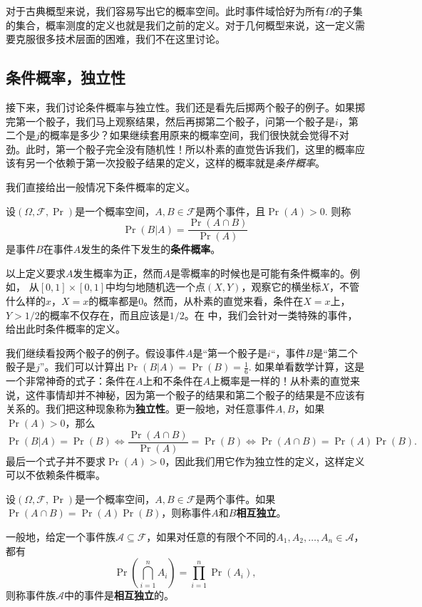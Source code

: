 对于古典概型来说，我们容易写出它的概率空间。此时事件域恰好为所有$\Omega$的子集的集合，概率测度的定义也就是我们之前的定义。对于几何概型来说，这一定义需要克服很多技术层面的困难，我们不在这里讨论。

\subsection{条件概率，独立性}
接下来，我们讨论条件概率与独立性。我们还是看先后掷两个骰子的例子。如果掷完第一个骰子，我们马上观察结果，然后再掷第二个骰子，问第一个骰子是$i$，第二个是$j$的概率是多少？如果继续套用原来的概率空间，我们很快就会觉得不对劲。此时，第一个骰子完全没有随机性！所以朴素的直觉告诉我们，这里的概率应该有另一个依赖于第一次投骰子结果的定义，这样的概率就是\emph{条件概率}。

我们直接给出一般情况下条件概率的定义。

\begin{definition}[条件概率]
设$(\Omega,\mathscr{F},\Pr)$是一个概率空间，$A,B\in\mathscr{F}$是两个事件，且$\Pr(A)>0$. 则称
\[
    \Pr(B|A) = \frac{\Pr(A\cap B)}{\Pr(A)}
\]
是事件$B$在事件$A$发生的条件下发生的\textbf{条件概率}。
\end{definition}

以上定义要求$A$发生概率为正，然而$A$是零概率的时候也是可能有条件概率的。例如，
从$[0,1]\times[0,1]$中均匀地随机选一个点$(X,Y)$，观察它的横坐标$X$，不管什么样的$x$，$X=x$的概率都是$0$。然而，从朴素的直觉来看，条件在$X=x$上，$Y>1/2$的概率不仅存在，而且应该是$1/2$。在 中，我们会针对一类特殊的事件，给出此时条件概率的定义。

我们继续看投两个骰子的例子。假设事件$A$是“第一个骰子是$i$“，事件$B$是“第二个骰子是$j$”。我们可以计算出$\Pr(B|A)=\Pr(B)=\frac{1}{6}$. 如果单看数学计算，这是一个非常神奇的式子：条件在$A$上和不条件在$A$上概率是一样的！从朴素的直觉来说，这件事情却并不神秘，因为第一个骰子的结果和第二个骰子的结果是不应该有关系的。我们把这种现象称为\textbf{独立性}。更一般地，对任意事件$A,B$，如果$\Pr(A)>0$，那么
\[\Pr(B|A)=\Pr(B)\iff \frac{\Pr(A\cap B)}{\Pr(A)}=\Pr(B)\iff \Pr(A\cap B)=\Pr(A)\Pr(B).\]
最后一个式子并不要求$\Pr(A)>0$，因此我们用它作为独立性的定义，这样定义可以不依赖条件概率。

\begin{definition}[独立性]
设$(\Omega,\mathscr{F},\Pr)$是一个概率空间，$A,B\in\mathscr{F}$是两个事件。如果$\Pr(A\cap B)=\Pr(A)\Pr(B)$，则称事件$A$和$B$\textbf{相互独立}。

一般地，给定一个事件族$\mathscr{A}\subseteq\mathscr{F}$，如果对任意的有限个不同的$A_1,A_2,\ldots,A_n\in\mathscr{A}$，都有
\[
    \Pr\left(\bigcap_{i=1}^n A_i\right) = \prod_{i=1}^n \Pr(A_i),
\]
则称事件族$\mathscr{A}$中的事件是\textbf{相互独立}的。
\end{definition}

